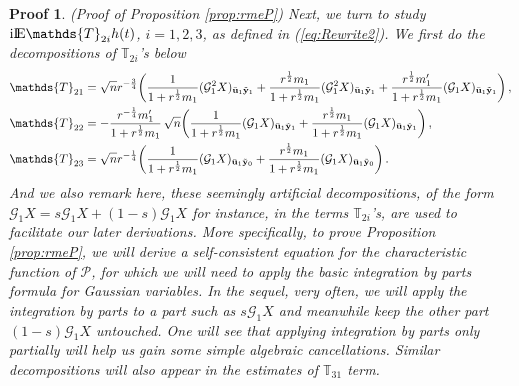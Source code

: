 \documentclass[12pt]{article}
\numberwithin{equation}{section}
\newtheorem{myPro}{Proof}
\theoremstyle{remark}
\newcommand{\1}{{\rm 1}\kern-0.24em{\rm I}}
\newcommand{\E}{{\rm I}\kern-0.18em{\rm E}}
\begin{document}
\begin{appendices}
\begin{myPro}{(Proof of Proposition  \ref{prop:rmeP})}
Next, we turn to study $\mathrm{i}\E\mathds{T}_{2i}h(t)$, $i=1,2,3$,  as defined in (\ref{eq:Rewrite2}).
We first do the decompositions of $\mathds{T}_{2i}$'s below
\begin{align}
&\mathds{T}_{21}=\sqrt n r^{-\frac 34}\bigg( \frac{1}{1+r^{\frac 12} m_1} (\mathcal{G}_1^2{X})_{\bar{\bf u}_1\tilde{{\bf y}}_1} +  \frac{r^{\frac 12} m_1}{1+r^{\frac 12} m_1}(\mathcal{G}_1^2{X})_{\bar{\bf u}_1\tilde{{\bf y}}_1}  +  \frac{r^{\frac 12}  m_1'}{1+r^{\frac 12} m_1}(\mathcal{G}_1{X})_{\bar{\bf u}_1\tilde{{\bf y}}_1}\bigg)\,,\label{2021051601}\\
&\mathds{T}_{22}= - \frac{r^{-\frac14} m_1'}{1+r^{\frac 12}  m_1} \,\sqrt n \bigg( \frac{1}{1+r^{\frac 12}  m_1}  (\mathcal{G}_1{X})_{\bar{\bf u}_1\tilde{{\bf y}}_1} + \frac{r^{\frac 12} m_1}{1+r^{\frac 12} m_1} (\mathcal{G}_1{X})_{\bar{\bf u}_1\tilde{{\bf y}}_1}\bigg)\,,\notag\\
& \mathds{T}_{23}= \sqrt n r^{-\frac 14}\bigg( \frac{1}{1+r^{\frac 12} m_1} (\mathcal{G}_1{X})_{\bar{\bf u}_1\tilde{{\bf y}}_0} + \frac{r^{\frac 12} m_1}{1+ r^{\frac 12}  m_1} (\mathcal{G}_1{X})_{\bar{\bf u}_1\tilde{{\bf y}}_0}\bigg)\,. \nonumber
\end{align} 
And we also remark here, these seemingly artificial decompositions,  of the form $\mathcal{G}_1X=s\mathcal{G}_1X+(1-s)\mathcal{G}_1X$ for instance, in the terms $\mathds{T}_{2i}$'s, are used to facilitate our later derivations. More specifically, to prove Proposition  \ref{prop:rmeP}, we will  derive  a self-consistent equation  for the characteristic function of $\mathcal{P}$,  for which we will need to apply the basic integration by parts formula for Gaussian variables. In the sequel, very often, we will apply the integration by parts to a part such as $s\mathcal{G}_1X$ and meanwhile keep the other part $(1-s)\mathcal{G}_1X$ untouched. One will see that applying integration by parts only partially will help us gain some simple algebraic cancellations. Similar decompositions will also appear in the estimates of $\mathds{T}_{31}$ term.




\end{myPro}
\end{appendices}
\end{document}
